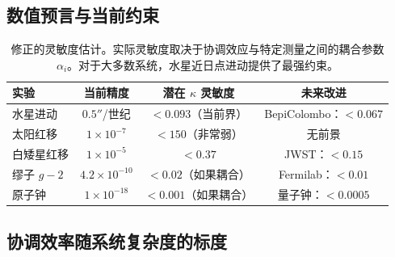 \documentclass[11pt,a4paper]{article}
\begin{document}
	\subsection{数值预言与当前约束}
	
	\begin{table}[htbp]
		\centering
		\small
		\begin{tabular}{lccc}
			\toprule
			\textbf{实验} & \textbf{当前精度} & \textbf{潜在 $\kappa$ 灵敏度} & \textbf{未来改进} \\
			\midrule
			水星进动 & $0.5''$/世纪 & $<0.093$（当前界） & BepiColombo：$<0.067$ \\
			太阳红移 & $1\times10^{-7}$ & $<150$（非常弱） & 无前景 \\
			白矮星红移 & $1\times10^{-5}$ & $<0.37$ & JWST：$<0.15$ \\
			缪子 $g-2$ & $4.2\times10^{-10}$ & $<0.02$（如果耦合） & Fermilab：$<0.01$ \\
			原子钟 & $1\times10^{-18}$ & $<0.001$（如果耦合） & 量子钟：$<0.0005$ \\
			\bottomrule
		\end{tabular}
		\caption{修正的灵敏度估计。实际灵敏度取决于协调效应与特定测量之间的耦合参数 $\alpha_i$。对于大多数系统，水星近日点进动提供了最强约束。}
	\end{table}
	
	\subsection{协调效率随系统复杂度的标度}
	
\end{document}
